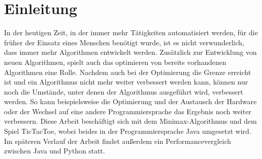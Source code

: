 \chapter{Einleitung}
In der heutigen Zeit, in der immer mehr Tätigkeiten automatisiert werden, für die früher der Einsatz eines Menschen benötigt wurde,
ist es nicht verwunderlich, dass immer mehr Algorithmen entwickelt werden. Zusätzlich zur Entwicklung von neuen Algorithmen, spielt
auch das optimieren von bereits vorhandenen Algorithmen eine Rolle. Nachdem auch bei der Optimierung die Grenze erreicht ist und ein
Algorithmus nicht mehr weiter verbessert werden kann, können nur noch die Umstände, unter denen der Algorithmus ausgeführt wird,
verbessert werden. So kann beispielsweise die Optimierung und der Austausch der Hardware oder der Wechsel auf eine andere
Programmiersprache das Ergebnis noch weiter verbessern. Diese Arbeit beschäftigt sich mit dem Minimax-Algorithmus und dem Spiel
TicTacToe, wobei beides in der Programmiersprache Java umgesetzt wird. Im späteren Verlauf der Arbeit findet außerdem ein
Performancevergleich zwischen Java und Python statt.